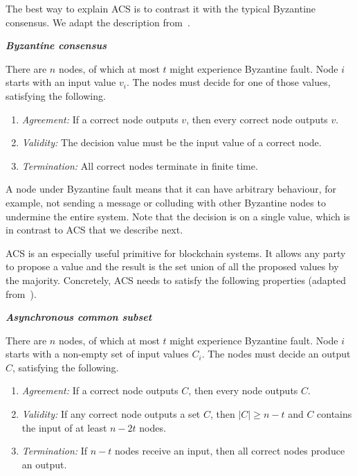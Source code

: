 The best way to explain ACS is to contrast it with the typical Byzantine consensus.
We adapt the description from~\cite[Chapter 17]{podc}.
\begin{definition}
\textbf{\emph{Byzantine consensus}}

There are $n$ nodes, of which at most $t$ might experience Byzantine fault.
Node $i$ starts with an input value $v_i$.
The nodes must decide for one of  those values, satisfying the following.
\begin{enumerate}
    \item \emph{Agreement:}
        If a correct node outputs $v$, then every correct node outputs $v$.
    \item \emph{Validity:}
        The decision value must be the input value of a correct node.
    \item \emph{Termination:}
        All correct nodes terminate in finite time.
\end{enumerate}
\end{definition}
A node under Byzantine fault means that it can have arbitrary behaviour,
for example, not sending a message or colluding with other Byzantine nodes to undermine the entire system.
Note that the decision is on a single value,
which is in contrast to ACS that we describe next.

ACS is an especially useful primitive for blockchain systems.
It allows any party to propose a value and the result is the set union of all the proposed values by the majority.
Concretely, ACS needs to satisfy the following properties (adapted from~\cite{miller2016honey}).
\begin{definition}
\label{def:acs}
\textbf{\emph{Asynchronous common subset}}

There are $n$ nodes, of which at most $t$ might experience Byzantine fault.
Node $i$ starts with a non-empty set of input values $C_i$.
The nodes must decide an output $C$, satisfying the following.
\begin{enumerate}
    \item \emph{Agreement:}
        If a correct node outputs $C$, then every node outputs $C$.
    \item \emph{Validity:}
        If any correct node outputs a set $C$,
        then $|C| \ge n - t$ and $C$ contains the input of at least $n - 2t$ nodes.
    \item \emph{Termination:}
        If $n - t$ nodes receive an input, then all correct nodes produce an output.
\end{enumerate}
\end{definition}

